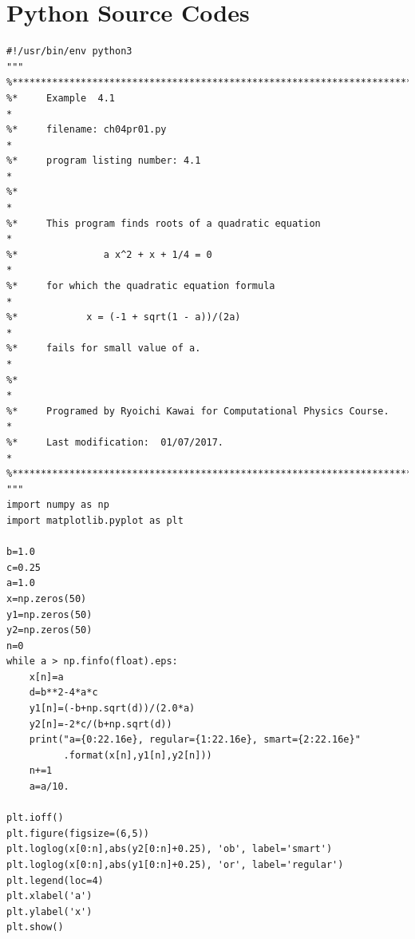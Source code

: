 \section*{Python Source Codes}
\setcounter{program}{0}

\bigskip\noindent
\program
\footnotesize
\begin{verbatim}
#!/usr/bin/env python3
"""
%**************************************************************************
%*     Example  4.1                                                       *
%*     filename: ch04pr01.py                                              *
%*     program listing number: 4.1                                        *
%*                                                                        *
%*     This program finds roots of a quadratic equation                   *
%*               a x^2 + x + 1/4 = 0                                      *
%*     for which the quadratic equation formula                           * 
%*            x = (-1 + sqrt(1 - a))/(2a)                                 *
%*     fails for small value of a.                                        *
%*                                                                        *
%*     Programed by Ryoichi Kawai for Computational Physics Course.       *
%*     Last modification:  01/07/2017.                                    *
%**************************************************************************
"""
import numpy as np
import matplotlib.pyplot as plt

b=1.0
c=0.25
a=1.0
x=np.zeros(50)
y1=np.zeros(50)
y2=np.zeros(50)
n=0
while a > np.finfo(float).eps:
    x[n]=a
    d=b**2-4*a*c
    y1[n]=(-b+np.sqrt(d))/(2.0*a)
    y2[n]=-2*c/(b+np.sqrt(d))
    print("a={0:22.16e}, regular={1:22.16e}, smart={2:22.16e}"
          .format(x[n],y1[n],y2[n]))
    n+=1
    a=a/10.

plt.ioff()
plt.figure(figsize=(6,5))
plt.loglog(x[0:n],abs(y2[0:n]+0.25), 'ob', label='smart')
plt.loglog(x[0:n],abs(y1[0:n]+0.25), 'or', label='regular')
plt.legend(loc=4)
plt.xlabel('a')
plt.ylabel('x')
plt.show()
\end{verbatim}
\normalsize


